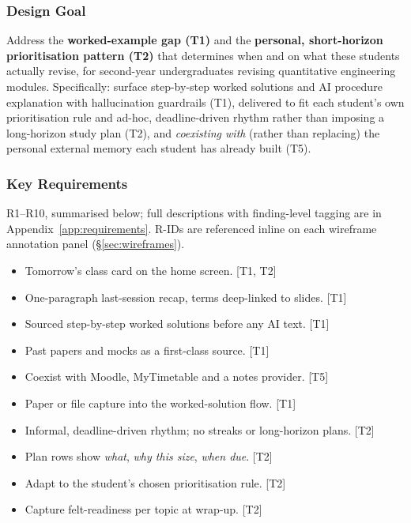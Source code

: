\documentclass[a4paper,11pt]{article}
\begin{document}
\subsubsection*{Design Goal}

Address the \textbf{worked-example gap (T1)} and the
\textbf{personal, short-horizon prioritisation pattern (T2)} that
determines when and on what these students actually revise, for
second-year undergraduates revising quantitative engineering
modules. Specifically: surface step-by-step worked solutions and
AI procedure explanation with hallucination guardrails (T1),
delivered to fit each student's own prioritisation rule and ad-hoc,
deadline-driven rhythm rather than imposing a long-horizon study
plan (T2), and \emph{coexisting with} (rather than replacing) the
personal external memory each student has already built (T5).

\subsubsection*{Key Requirements}

R1--R10, summarised below; full descriptions with finding-level
tagging are in Appendix~\ref{app:requirements}. R-IDs are
referenced inline on each wireframe annotation panel
(\S\ref{sec:wireframes}).

\begin{itemize}[leftmargin=2.4em,itemsep=1pt]
  \item[\textbf{R1}] Tomorrow's class card on the home screen. [T1, T2]
  \item[\textbf{R2}] One-paragraph last-session recap, terms deep-linked to slides. [T1]
  \item[\textbf{R3}] Sourced step-by-step worked solutions before any AI text. [T1]
  \item[\textbf{R4}] Past papers and mocks as a first-class source. [T1]
  \item[\textbf{R5}] Coexist with Moodle, MyTimetable and a notes provider. [T5]
  \item[\textbf{R6}] Paper or file capture into the worked-solution flow. [T1]
  \item[\textbf{R7}] Informal, deadline-driven rhythm; no streaks or long-horizon plans. [T2]
  \item[\textbf{R8}] Plan rows show \emph{what}, \emph{why this size}, \emph{when due}. [T2]
  \item[\textbf{R9}] Adapt to the student's chosen prioritisation rule. [T2]
  \item[\textbf{R10}] Capture felt-readiness per topic at wrap-up. [T2]
\end{itemize}
\end{document}
